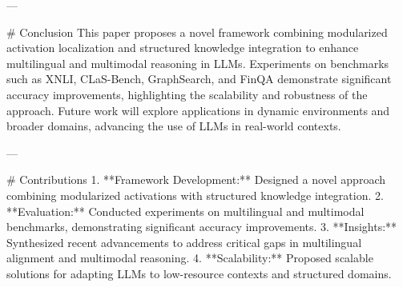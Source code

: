 ---

# Conclusion  
This paper proposes a novel framework combining modularized activation localization and structured knowledge integration to enhance multilingual and multimodal reasoning in LLMs. Experiments on benchmarks such as XNLI, CLaS-Bench, GraphSearch, and FinQA demonstrate significant accuracy improvements, highlighting the scalability and robustness of the approach. Future work will explore applications in dynamic environments and broader domains, advancing the use of LLMs in real-world contexts.

---

# Contributions  
1. **Framework Development:** Designed a novel approach combining modularized activations with structured knowledge integration.  
2. **Evaluation:** Conducted experiments on multilingual and multimodal benchmarks, demonstrating significant accuracy improvements.  
3. **Insights:** Synthesized recent advancements to address critical gaps in multilingual alignment and multimodal reasoning.  
4. **Scalability:** Proposed scalable solutions for adapting LLMs to low-resource contexts and structured domains.  


